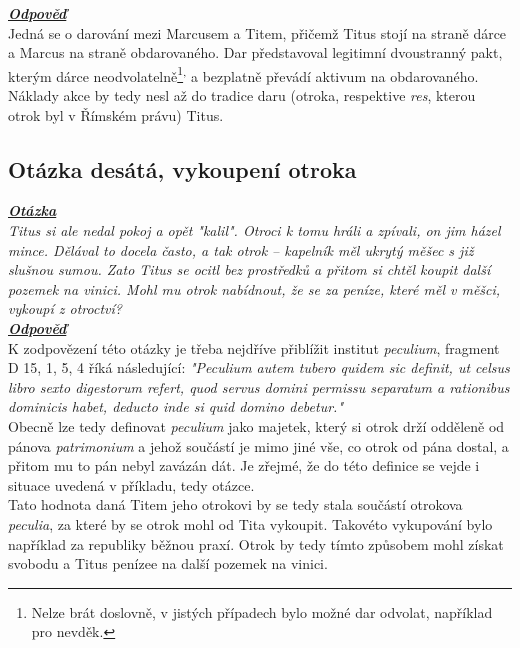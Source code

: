 \documentclass{article}
\begin{document}
\noindent\noindent\textbf{\textit{\underline{Odpověď}}}\\

Jedná se o darování mezi Marcusem a Titem, přičemž Titus stojí na straně dárce a Marcus na straně obdarovaného. Dar představoval legitimní dvoustranný pakt, kterým dárce neodvolatelně\footnote{Nelze brát doslovně, v jistých případech bylo možné dar odvolat, například pro nevděk.}\textsuperscript{,} a bezplatně převádí aktivum na obdarovaného. Náklady akce by tedy nesl až do tradice daru (otroka, respektive \textit{res}, kterou otrok byl v Římském právu) Titus.

\subsection{Otázka desátá, vykoupení otroka}
\textbf{\textit{\underline{Otázka}}}\\
\textit{Titus si ale nedal pokoj a opět "kalil". Otroci k tomu hráli a zpívali, on jim házel mince. Dělával to docela často, a tak otrok – kapelník měl ukrytý měšec s již slušnou sumou. Zato Titus se ocitl bez prostředků a přitom si chtěl koupit další pozemek na vinici. Mohl mu otrok nabídnout, že se za peníze, které měl v měšci, vykoupí z otroctví?}\\

\noindent\noindent\textbf{\textit{\underline{Odpověď}}}\\

K zodpovězení této otázky je třeba nejdříve přiblížit institut \textit{peculium},  fragment D 15, 1, 5, 4 říká následující: \textit{"Peculium autem tubero quidem sic definit, ut celsus libro sexto digestorum refert, quod servus domini permissu separatum a rationibus dominicis habet, deducto inde si quid domino debetur."}\\

Obecně lze tedy definovat \textit{peculium} jako majetek, který si otrok drží odděleně od pánova \textit{patrimonium} a jehož součástí je mimo jiné vše, co otrok od pána dostal, a přitom mu to pán nebyl zavázán dát. Je zřejmé, že do této definice se vejde i situace uvedená v příkladu, tedy otázce.\\

Tato hodnota daná Titem jeho otrokovi by se tedy stala součástí otrokova \textit{peculia}, za které by se otrok mohl od Tita vykoupit. Takovéto vykupování bylo například za republiky běžnou praxí. Otrok by tedy tímto způsobem mohl získat svobodu a Titus penízee na další pozemek na vinici.
\end{document}
